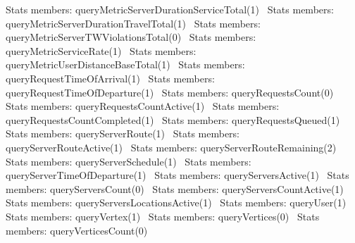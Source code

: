 \LA{}Stats members: queryMetricServerDurationServiceTotal(1)~{\nwtagstyle{}}\RA{}
\LA{}Stats members: queryMetricServerDurationTravelTotal(1)~{\nwtagstyle{}}\RA{}
\LA{}Stats members: queryMetricServerTWViolationsTotal(0)~{\nwtagstyle{}}\RA{}
\LA{}Stats members: queryMetricServiceRate(1)~{\nwtagstyle{}}\RA{}
\LA{}Stats members: queryMetricUserDistanceBaseTotal(1)~{\nwtagstyle{}}\RA{}
\LA{}Stats members: queryRequestTimeOfArrival(1)~{\nwtagstyle{}}\RA{}
\LA{}Stats members: queryRequestTimeOfDeparture(1)~{\nwtagstyle{}}\RA{}
\LA{}Stats members: queryRequestsCount(0)~{\nwtagstyle{}}\RA{}
\LA{}Stats members: queryRequestsCountActive(1)~{\nwtagstyle{}}\RA{}
\LA{}Stats members: queryRequestsCountCompleted(1)~{\nwtagstyle{}}\RA{}
\LA{}Stats members: queryRequestsQueued(1)~{\nwtagstyle{}}\RA{}
\LA{}Stats members: queryServerRoute(1)~{\nwtagstyle{}}\RA{}
\LA{}Stats members: queryServerRouteActive(1)~{\nwtagstyle{}}\RA{}
\LA{}Stats members: queryServerRouteRemaining(2)~{\nwtagstyle{}}\RA{}
\LA{}Stats members: queryServerSchedule(1)~{\nwtagstyle{}}\RA{}
\LA{}Stats members: queryServerTimeOfDeparture(1)~{\nwtagstyle{}}\RA{}
\LA{}Stats members: queryServersActive(1)~{\nwtagstyle{}}\RA{}
\LA{}Stats members: queryServersCount(0)~{\nwtagstyle{}}\RA{}
\LA{}Stats members: queryServersCountActive(1)~{\nwtagstyle{}}\RA{}
\LA{}Stats members: queryServersLocationsActive(1)~{\nwtagstyle{}}\RA{}
\LA{}Stats members: queryUser(1)~{\nwtagstyle{}}\RA{}
\LA{}Stats members: queryVertex(1)~{\nwtagstyle{}}\RA{}
\LA{}Stats members: queryVertices(0)~{\nwtagstyle{}}\RA{}
\LA{}Stats members: queryVerticesCount(0)~{\nwtagstyle{}}\RA{}
\nwendcode{}\nwdocspar

